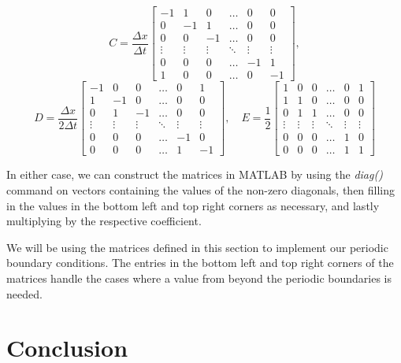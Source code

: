 \documentclass{myproject}
\begin{document}
\[
C = \frac{\Delta x}{\Delta t}
\begin{bmatrix}
-1 & 1 & 0 & \dots & 0 & 0 \\
0 & -1 & 1 & \dots & 0 & 0 \\
0 & 0 & -1 & \dots & 0 & 0 \\
\vdots & \vdots & \vdots & \ddots & \vdots & \vdots \\
0 & 0 & 0 & \dots & -1 & 1 \\
1 & 0 & 0 & \dots & 0 & -1
\end{bmatrix},
\]
\[
D = \frac{\Delta x}{2 \Delta t}
\begin{bmatrix}
-1 & 0 & 0 & \dots & 0 & 1 \\
1 & -1 & 0 & \dots & 0 & 0 \\
0 & 1 & -1 & \dots & 0 & 0 \\
\vdots & \vdots & \vdots & \ddots & \vdots & \vdots \\
0 & 0 & 0 & \dots & -1 & 0 \\
0 & 0 & 0 & \dots & 1 & -1
\end{bmatrix},
\quad
E = \frac{1}{2}
\begin{bmatrix}
1 & 0 & 0 & \dots & 0 & 1 \\
1 & 1 & 0 & \dots & 0 & 0 \\
0 & 1 & 1 & \dots & 0 & 0 \\
\vdots & \vdots & \vdots & \ddots & \vdots & \vdots \\
0 & 0 & 0 & \dots & 1 & 0 \\
0 & 0 & 0 & \dots & 1 & 1
\end{bmatrix}
\]

In either case, we can construct the matrices in MATLAB by using the \textit{diag()} command on vectors containing the values of the non-zero diagonals, then filling in the values in the bottom left and top right corners as necessary, and lastly multiplying by the respective coefficient.

We will be using the matrices defined in this section to implement our periodic boundary conditions. The entries in the bottom left and top right corners of the matrices handle the cases where a value from beyond the periodic boundaries is needed.

\section{Conclusion}

\nocite{iserles2009}
\nocite{trefethen2000}
\nocite{leveque1992}
\nocite{leveque2002}
\printbibliography
\end{document}
